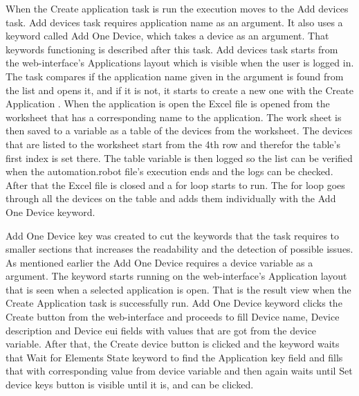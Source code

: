 When the Create application task is run the execution moves to the Add devices task.
Add devices task requires application name as an argument.
It also uses a keyword called Add One Device, which takes a device as an argument. That keywords functioning is described after this task.
Add devices task starts from the web-interface's Applications layout which is visible when the user is logged in. 
The task compares if the application name given in the argument is found from the list and opens it, and if it is not, it starts to create a new one with the Create Application .
When the application is open the Excel file is opened from the worksheet that has a corresponding name to the application.
The work sheet is then saved to a variable as a table of the devices from the worksheet.
The devices that are listed to the worksheet start from the 4th row and therefor the table's first index is set there.
The table variable is then logged so the list can be verified when the automation.robot file's execution ends and the logs can be checked.
After that the Excel file is closed and a for loop starts to run.
The for loop goes through all the devices on the table and adds them individually with the Add One Device keyword.

Add One Device key was created to cut the keywords that the task requires to smaller sections that increases the readability and the detection of possible issues.
As mentioned earlier the Add One Device requires a device variable as a argument.
The keyword starts running on the web-interface's Application layout that is seen when a selected application is open.
That is the result view when the Create Application task is successfully run.
Add One Device keyword  clicks the Create button from the web-interface and proceeds to fill Device name, Device description and Device \gls{eui} fields with values that are got from the device variable.
After that, the Create device button is clicked and the keyword waits that Wait for Elements State keyword to find the Application key field and fills that with corresponding value from device variable and then again waits until Set device keys button is visible until it is, and can be clicked.


\cite{chirpstack:getting_started}
\cite{robot_framwework_user_guide:suite_setup_and_teardown}
\clearpage %
